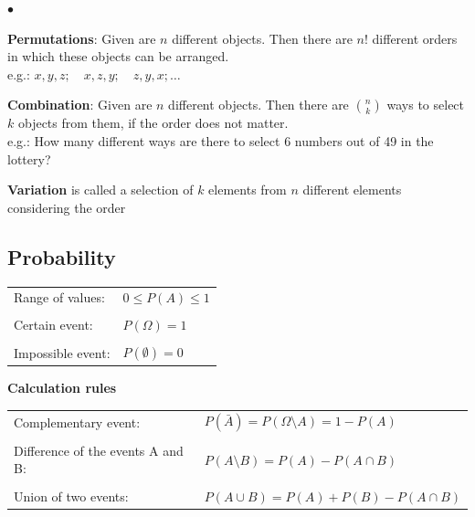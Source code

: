         \begin{list}{$\bullet$}{\setlength{\itemsep}{0cm} \setlength{\parsep}{0cm} \setlength{\topsep}{0.1cm}}
            \item \textbf{Permutations}: Given are $n$ different objects. Then there are $n!$
            different orders in which these objects can be arranged. \\
            e.g.: $x,y,z;\quad x,z,y;\quad z,y,x;\ldots$
            \item \textbf{Combination}: Given are $n$ different objects. Then there are $\binom n k$
            ways to select $k$ objects from them, if the order does not matter. \\
            e.g.: How many different ways are there to select 6 numbers out of 49
            in the lottery?
            \item \textbf{Variation} is called a selection of $k$ elements from $n$
                different elements considering the order
        \end{list}


\vspace{5mm}
    \begin{minipage}{6.8cm}
    \subsection{Probability}
        \begin{tabular}{ll}
            Range of values:
            & ${0}\le{P(A)}\le{1}$\\ \\
            Certain event:
            & $P(\Omega)=1$\\ \\
            Impossible event:
            & $P(\emptyset)=0$
        \end{tabular}
    \end{minipage}
        \begin{minipage}{11.2cm}
        \textbf{Calculation rules}\\
            \begin{tabular}{ll}
                Complementary event:
                &$P(\bar{A})=P({\Omega}\setminus{A})=1-P(A)$\\ \\
                Difference of the events A and B:
                &$P({A}\setminus{B})=P(A)-P({A}\cap{B})$\\ \\
                Union of two events:
                &$P({A}\cup{B})=P(A)+P(B)-P({A}\cap{B})$
            \end{tabular}
        \end{minipage}
\vspace{1mm}


